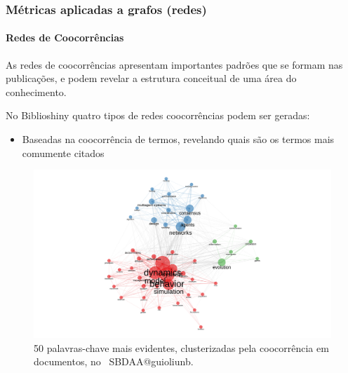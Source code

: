 \subsubsection{Métricas aplicadas a grafos (redes)}

\paragraph{Redes de Coocorrências}

As redes de coocorrências apresentam importantes padrões que se formam nas publicações, e podem revelar a estrutura conceitual de uma área do conhecimento.

No Biblioshiny quatro tipos de redes coocorrências podem ser geradas:
\begin{itemize}
    \item Baseadas na coocorrência de termos, revelando quais são os termos mais comumente citados 
\end{itemize}

\begin{figure}
    \centering
    \includegraphics[width=1\textwidth]{experiments/jhcf/PesqBibliogr/SimulacaoMultiagente/WoS-20220203/Estrutura/Conceitual/MASSA2-Co-occurrence-Network-50nodes-louvainclustering.png.png}
    \caption{50 palavras-chave mais evidentes, clusterizadas pela coocorrência em documentos, no  \dataset\ SBDAA@guioliunb.}
    \label{fig:MASSA2-Co-occurrence-Network-50nodes-louvainclustering.png}
\end{figure}

